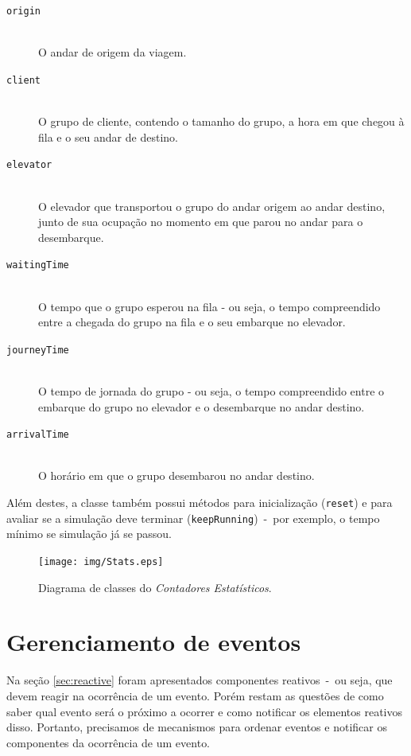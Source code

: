 \begin{description}
  \item[\texttt{origin}] \hfill \\
    O andar de origem da viagem.

  \item[\texttt{client}] \hfill \\
    O grupo de cliente, contendo o tamanho do grupo, a hora em que
    chegou à fila e o seu andar de destino.

  \item[\texttt{elevator}] \hfill \\
    O elevador que transportou o grupo do andar origem ao andar destino, junto
    de sua ocupação no momento em que parou no andar para o desembarque.

  \item[\texttt{waitingTime}] \hfill \\
    O tempo que o grupo esperou na fila - ou seja, o tempo compreendido entre a
    chegada do grupo na fila e o seu embarque no elevador.

  \item[\texttt{journeyTime}] \hfill \\
    O tempo de jornada do grupo - ou seja, o tempo compreendido entre o embarque
    do grupo no elevador e o desembarque no andar destino.

  \item[\texttt{arrivalTime}] \hfill \\
    O horário em que o grupo desembarou no andar destino.
\end{description}

Além destes, a classe também possui métodos para inicialização (\texttt{reset})
e para avaliar se a simulação deve terminar (\texttt{keepRunning})~-~por
exemplo, o tempo mínimo se simulação já se passou.

\begin{figure}[htb!]
  \centering
  \texttt{[image: img/Stats.eps]}
  \caption{Diagrama de classes do \textit{Contadores Estatísticos}.}
\label{fig:diagram:stats}
\end{figure}

\section{\label{sec:model:event}Gerenciamento de eventos}

Na seção \ref{sec:reactive} foram apresentados componentes reativos~-~ou seja,
que devem reagir na ocorrência de um evento. Porém restam as questões de como
saber qual evento será o próximo a ocorrer e como notificar os elementos
reativos disso. Portanto, precisamos de mecanismos para ordenar eventos e
notificar os componentes da ocorrência de um evento.

